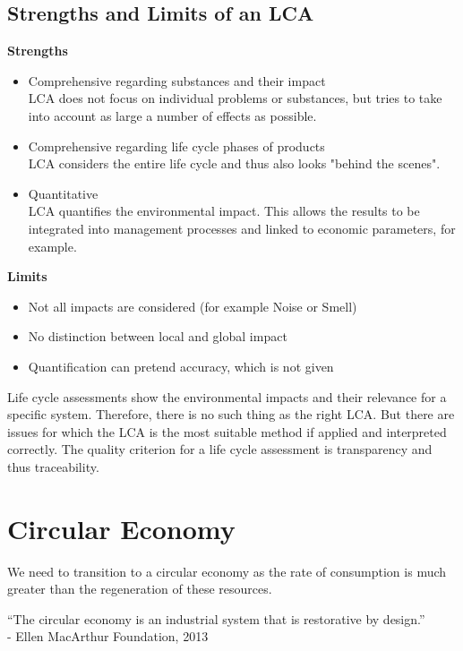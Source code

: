 \documentclass[11pt]{article}
\theoremstyle{definition}
\begin{document}
\subsection{Strengths and Limits of an LCA}
\textbf{Strengths}
\begin{itemize}
	\item Comprehensive regarding substances and their impact\\
	LCA does not focus on individual problems or substances, but tries to take into account as large a number of effects as possible.
	\item Comprehensive regarding life cycle phases of products\\
	LCA considers the entire life cycle and thus also looks "behind the scenes".
	\item Quantitative\\
	LCA quantifies the environmental impact. This allows the results to be integrated into management processes and linked to economic parameters, for example.
\end{itemize}

\vspace{1em}
\noindent
\textbf{Limits}
\begin{itemize}
	\item Not all impacts are considered (for example Noise or Smell)
	\item No distinction between local and global impact
	\item Quantification can pretend accuracy, which is not given
\end{itemize}

Life cycle assessments show the environmental impacts and their relevance for a specific system. Therefore, there is no such thing as the right LCA. But there are issues for which the LCA is the most suitable method if applied and interpreted correctly. The quality criterion for a life cycle assessment is transparency and thus traceability.

\section{Circular Economy}
We need to transition to a circular economy as the rate of consumption is much greater than the regeneration of these resources.
\begin{definition}
	\textquotedblleft The circular economy is an industrial system that is restorative by design.\textquotedblright\\
	\hspace*{1em} - Ellen MacArthur Foundation, 2013
\end{definition}
\end{document}
